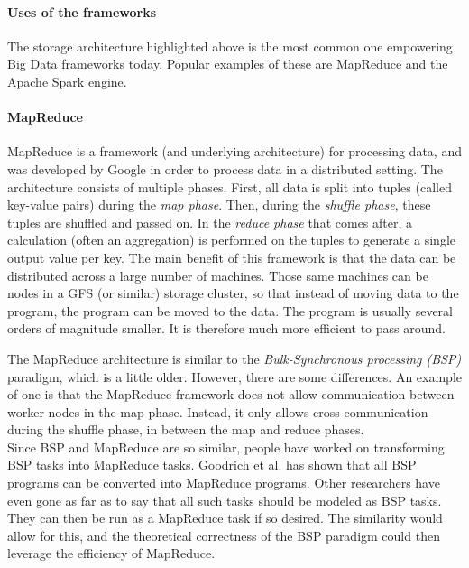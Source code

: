 \paragraph{Uses of the frameworks}
The storage architecture highlighted above is the most common one empowering Big Data frameworks today. Popular examples of these are MapReduce and the Apache Spark engine.

\paragraph{MapReduce}
MapReduce is a framework (and underlying architecture) for processing data, and was developed by Google\cite{Dean04} in order to process data in a distributed setting. The architecture consists of multiple phases. First, all data is split into tuples (called key-value pairs) during the \textit{map phase}. Then, during the \textit{shuffle phase}, these tuples are shuffled and passed on. In the \textit{reduce phase} that comes after, a calculation (often an aggregation) is performed on the tuples to generate a single output value per key. The main benefit of this framework is that the data can be distributed across a large number of machines. Those same machines can be nodes in a GFS (or similar) storage cluster, so that instead of moving data to the program, the program can be moved to the data. The program is usually several orders of magnitude smaller. It is therefore much more efficient to pass around. %

The MapReduce architecture is similar to the \textit{Bulk-Synchronous processing (BSP)} paradigm, which is a little older. However, there are some differences. An example of one is that the MapReduce framework does not allow communication between worker nodes in the map phase. Instead, it only allows cross-communication during the shuffle phase, in between the map and reduce phases\cite{Pace12}.\\
Since BSP and MapReduce are so similar, people have worked on transforming BSP tasks into MapReduce tasks. Goodrich et al.\cite{Goo11} has shown that all BSP programs can be converted into MapReduce programs. Other researchers have even gone as far as to say that all such tasks should be modeled as BSP tasks. They can then be run as a MapReduce task if so desired. The similarity would allow for this, and the theoretical correctness of the BSP paradigm could then leverage the efficiency of MapReduce\cite{Pace12}.

